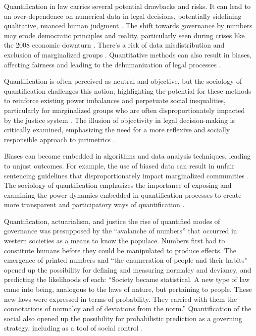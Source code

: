 Quantification in law carries several potential drawbacks and risks. It can lead to an over-dependence on numerical data in legal decisions, potentially sidelining qualitative, nuanced human judgment \cite{ribeiro2021,ribeiro2021}. The shift towards governance by numbers may erode democratic principles and reality, particularly seen during crises like the 2008 economic downturn \cite{ant2019}. There's a risk of data misdistribution and exclusion of marginalized groups \cite{sareen2020}. Quantitative methods can also result in biases, affecting fairness and leading to the dehumanization of legal processes \cite{lynch2019, ribeiro2021}.

Quantification is often perceived as neutral and objective, but the sociology of quantification challenges this notion, highlighting the potential for these methods to reinforce existing power imbalances and perpetuate social inequalities, particularly for marginalized groups who are often disproportionately impacted by the justice system \cite{10.1007/978-3-319-44000-2_15,10.3390/fi9040068}. The illusion of objectivity in legal decision-making is critically examined, emphasizing the need for a more reflexive and socially responsible approach to jurimetrics \cite{10.1007/978-3-319-44000-2_15,10.3390/fi9040068}.

Biases can become embedded in algorithms and data analysis techniques, leading to unjust outcomes. For example, the use of biased data can result in unfair sentencing guidelines that disproportionately impact marginalized communities \cite{10.1590/data.2022.65.3.267,10.1057/s41599-020-00557-0}. The sociology of quantification emphasizes the importance of exposing and examining the power dynamics embedded in quantification processes to create more transparent and participatory ways of quantification \cite{10.1057/s41599-020-00557-0}.

Quantification, actuarialism, and justice the rise of quantified modes of governance was presupposed by the “avalanche of numbers” that occurred in western societies as a means to know the populace. Numbers first had to constitute humans before they could be manipulated to produce effects. The emergence of printed numbers and “the enumeration of people and their habits” opened up the possibility for defining and measuring normalcy and deviancy, and predicting the likelihoods of each: “Society became statistical. A new type of law came into being, analogous to the laws of nature, but pertaining to people. These new laws were expressed in terms of probability. They carried with them the connotations of normalcy and of deviations from the norm.” Quantification of the social also opened up the possibility for probabilistic prediction as a governing strategy, including as a tool of social control \cite{10_1111_lsi_12334}.

